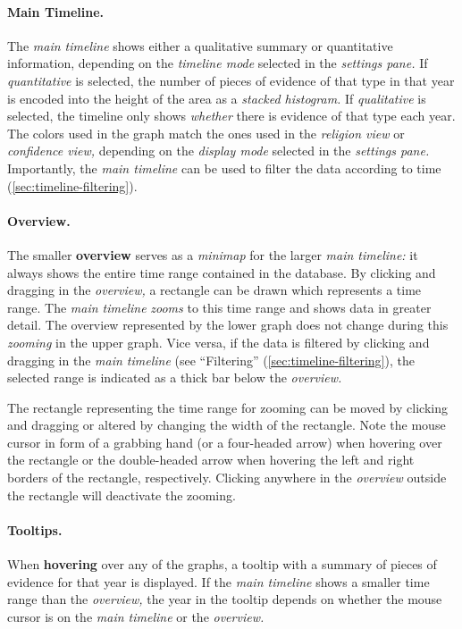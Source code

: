 \paragraph{Main Timeline.}
The \emph{main timeline} shows either a qualitative summary or quantitative information, depending on the \emph{timeline mode} selected in the \emph{settings pane.}
If \emph{quantitative} is selected, the number of pieces of evidence of that type in that year is encoded into the height of the area as a \emph{stacked histogram.}
If \emph{qualitative} is selected, the timeline only shows \emph{whether} there is evidence of that type each year.
The colors used in the graph match the ones used in the \emph{religion view} or \emph{confidence view,} depending on the \emph{display mode} selected in the \emph{settings pane.}
Importantly, the \emph{main timeline} can be used to filter the data according to time (\cref{sec:timeline-filtering}).


\paragraph{Overview.}
The smaller \textbf{overview} serves as a \emph{minimap} for the larger \emph{main timeline:}
it always shows the entire time range contained in the database.
By clicking and dragging in the \emph{overview,} a rectangle can be drawn which represents a time range.
The \emph{main timeline} \emph{zooms} to this time range and shows data in greater detail.
The overview represented by the lower graph does not change during this \emph{zooming} in the upper graph.
Vice versa, if the data is filtered by clicking and dragging in the \emph{main timeline} (see \enquote{Filtering} (\cref{sec:timeline-filtering}), the selected range is indicated as a thick bar below the \emph{overview.}

The rectangle representing the time range for zooming can be moved by clicking and dragging or altered by changing the width of the rectangle.
Note the mouse cursor in form of a grabbing hand (or a four-headed arrow) when hovering over the rectangle or the double-headed arrow when hovering the left and right borders of the rectangle, respectively.
Clicking anywhere in the \emph{overview} outside the rectangle will deactivate the zooming.

\paragraph{Tooltips.}

When \textbf{hovering} over any of the graphs, a tooltip with a summary of pieces of evidence for that year is displayed.
If the \emph{main timeline} shows a smaller time range than the \emph{overview,} the year in the tooltip depends on whether the mouse cursor is on the \emph{main timeline} or the \emph{overview.}

